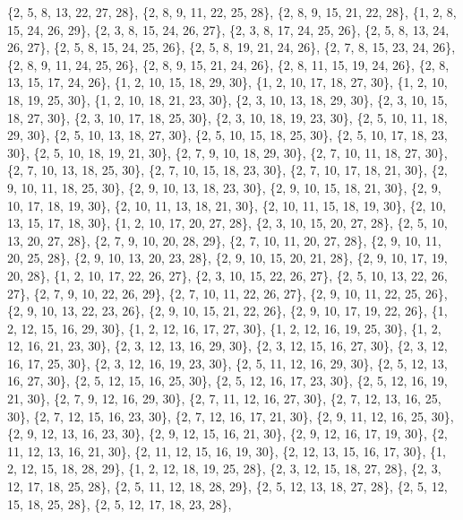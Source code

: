 \documentclass[11pt,a4paper]{article}
\begin{document}
{\{2, 5, 8, 13, 22, 27, 28\}, \{2, 8, 9, 11, 22, 25, 28\}, \{2, 8, 9, 15, 21, 22, 28\}, \{1, 2, 8, 15, 24, 26, 29\}, \{2, 3, 8, 15, 24, 26, 27\},
\{2, 3, 8, 17, 24, 25, 26\}, \{2, 5, 8, 13, 24, 26, 27\}, \{2, 5, 8, 15, 24, 25, 26\}, \{2, 5, 8, 19, 21, 24, 26\}, \{2, 7, 8, 15, 23, 24, 26\},
\{2, 8, 9, 11, 24, 25, 26\}, \{2, 8, 9, 15, 21, 24, 26\}, \{2, 8, 11, 15, 19, 24, 26\}, \{2, 8, 13, 15, 17, 24, 26\}, \{1, 2, 10, 15, 18, 29, 30\},
\{1, 2, 10, 17, 18, 27, 30\}, \{1, 2, 10, 18, 19, 25, 30\}, \{1, 2, 10, 18, 21, 23, 30\}, \{2, 3, 10, 13, 18, 29, 30\}, \{2, 3, 10, 15, 18, 27, 30\},
\{2, 3, 10, 17, 18, 25, 30\}, \{2, 3, 10, 18, 19, 23, 30\}, \{2, 5, 10, 11, 18, 29, 30\}, \{2, 5, 10, 13, 18, 27, 30\}, \{2, 5, 10, 15, 18, 25, 30\},
\{2, 5, 10, 17, 18, 23, 30\}, \{2, 5, 10, 18, 19, 21, 30\}, \{2, 7, 9, 10, 18, 29, 30\}, \{2, 7, 10, 11, 18, 27, 30\}, \{2, 7, 10, 13, 18, 25, 30\},
\{2, 7, 10, 15, 18, 23, 30\}, \{2, 7, 10, 17, 18, 21, 30\}, \{2, 9, 10, 11, 18, 25, 30\}, \{2, 9, 10, 13, 18, 23, 30\}, \{2, 9, 10, 15, 18, 21, 30\},
\{2, 9, 10, 17, 18, 19, 30\}, \{2, 10, 11, 13, 18, 21, 30\}, \{2, 10, 11, 15, 18, 19, 30\}, \{2, 10, 13, 15, 17, 18, 30\}, \{1, 2, 10, 17, 20, 27, 28\},
\{2, 3, 10, 15, 20, 27, 28\}, \{2, 5, 10, 13, 20, 27, 28\}, \{2, 7, 9, 10, 20, 28, 29\}, \{2, 7, 10, 11, 20, 27, 28\}, \{2, 9, 10, 11, 20, 25, 28\},
\{2, 9, 10, 13, 20, 23, 28\}, \{2, 9, 10, 15, 20, 21, 28\}, \{2, 9, 10, 17, 19, 20, 28\}, \{1, 2, 10, 17, 22, 26, 27\}, \{2, 3, 10, 15, 22, 26, 27\},
\{2, 5, 10, 13, 22, 26, 27\}, \{2, 7, 9, 10, 22, 26, 29\}, \{2, 7, 10, 11, 22, 26, 27\}, \{2, 9, 10, 11, 22, 25, 26\}, \{2, 9, 10, 13, 22, 23, 26\},
\{2, 9, 10, 15, 21, 22, 26\}, \{2, 9, 10, 17, 19, 22, 26\}, \{1, 2, 12, 15, 16, 29, 30\}, \{1, 2, 12, 16, 17, 27, 30\}, \{1, 2, 12, 16, 19, 25, 30\},
\{1, 2, 12, 16, 21, 23, 30\}, \{2, 3, 12, 13, 16, 29, 30\}, \{2, 3, 12, 15, 16, 27, 30\}, \{2, 3, 12, 16, 17, 25, 30\}, \{2, 3, 12, 16, 19, 23, 30\},
\{2, 5, 11, 12, 16, 29, 30\}, \{2, 5, 12, 13, 16, 27, 30\}, \{2, 5, 12, 15, 16, 25, 30\}, \{2, 5, 12, 16, 17, 23, 30\}, \{2, 5, 12, 16, 19, 21, 30\},
\{2, 7, 9, 12, 16, 29, 30\}, \{2, 7, 11, 12, 16, 27, 30\}, \{2, 7, 12, 13, 16, 25, 30\}, \{2, 7, 12, 15, 16, 23, 30\}, \{2, 7, 12, 16, 17, 21, 30\},
\{2, 9, 11, 12, 16, 25, 30\}, \{2, 9, 12, 13, 16, 23, 30\}, \{2, 9, 12, 15, 16, 21, 30\}, \{2, 9, 12, 16, 17, 19, 30\}, \{2, 11, 12, 13, 16, 21, 30\},
\{2, 11, 12, 15, 16, 19, 30\}, \{2, 12, 13, 15, 16, 17, 30\}, \{1, 2, 12, 15, 18, 28, 29\}, \{1, 2, 12, 18, 19, 25, 28\}, \{2, 3, 12, 15, 18, 27, 28\},
\{2, 3, 12, 17, 18, 25, 28\}, \{2, 5, 11, 12, 18, 28, 29\}, \{2, 5, 12, 13, 18, 27, 28\}, \{2, 5, 12, 15, 18, 25, 28\}, \{2, 5, 12, 17, 18, 23, 28\},
}
\end{document}
